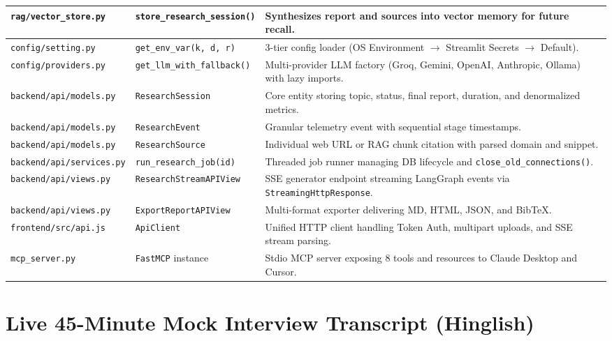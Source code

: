 \documentclass[11pt,a4paper,twoside]{report}
\begin{document}
\begin{center}
\begin{longtable}{|p{3.2cm}|p{4.5cm}|p{5.5cm}|}
\hline
\texttt{rag/vector\_store.py} & \texttt{store\_research\_session()} & Synthesizes report and sources into vector memory for future recall. \\
\hline
\texttt{config/setting.py} & \texttt{get\_env\_var(k, d, r)} & 3-tier config loader (OS Environment $\rightarrow$ Streamlit Secrets $\rightarrow$ Default). \\
\hline
\texttt{config/providers.py} & \texttt{get\_llm\_with\_fallback()} & Multi-provider LLM factory (Groq, Gemini, OpenAI, Anthropic, Ollama) with lazy imports. \\
\hline
\texttt{backend/api/models.py} & \texttt{ResearchSession} & Core entity storing topic, status, final report, duration, and denormalized metrics. \\
\hline
\texttt{backend/api/models.py} & \texttt{ResearchEvent} & Granular telemetry event with sequential stage timestamps. \\
\hline
\texttt{backend/api/models.py} & \texttt{ResearchSource} & Individual web URL or RAG chunk citation with parsed domain and snippet. \\
\hline
\texttt{backend/api/services.py} & \texttt{run\_research\_job(id)} & Threaded job runner managing DB lifecycle and \texttt{close\_old\_connections()}. \\
\hline
\texttt{backend/api/views.py} & \texttt{ResearchStreamAPIView} & SSE generator endpoint streaming LangGraph events via \texttt{StreamingHttpResponse}. \\
\hline
\texttt{backend/api/views.py} & \texttt{ExportReportAPIView} & Multi-format exporter delivering MD, HTML, JSON, and BibTeX. \\
\hline
\texttt{frontend/src/api.js} & \texttt{ApiClient} & Unified HTTP client handling Token Auth, multipart uploads, and SSE stream parsing. \\
\hline
\texttt{mcp\_server.py} & \texttt{FastMCP} instance & Stdio MCP server exposing 8 tools and resources to Claude Desktop and Cursor. \\
\hline
\end{longtable}
\end{center}



\chapter{Live 45-Minute Mock Interview Transcript (Hinglish)}
\end{document}
